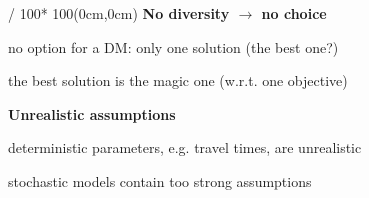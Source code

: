 \def\prc{\linewidth / 100}
\begin{textblock*}{\prc * 100}(0cm,0cm)%
\textbf{No diversity $\rightarrow$ no choice}
\begin{mylist}
\item no option for a DM: only one solution (the best one?)
\item the best solution is the magic one (w.r.t. one objective)
\end{mylist}

\textbf{Unrealistic assumptions}
\begin{mylist}
\item deterministic parameters, e.g. travel times, are unrealistic
\item stochastic models contain too strong assumptions
\end{mylist}
\end{textblock*}
